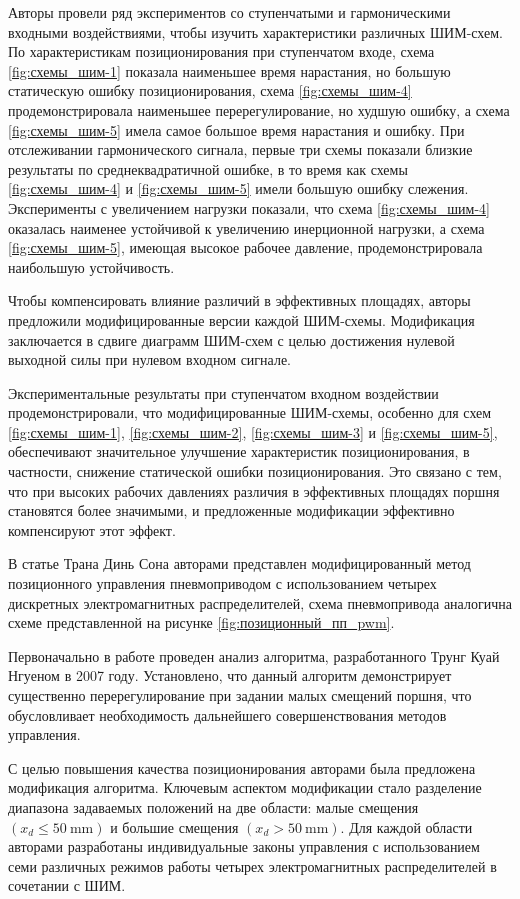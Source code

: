 Авторы провели ряд экспериментов со ступенчатыми и гармоническими входными воздействиями, чтобы изучить характеристики
различных ШИМ-схем. По характеристикам позиционирования при ступенчатом входе, схема \cref*{fig:схемы_шим-1} показала наименьшее время
нарастания, но большую статическую ошибку позиционирования, схема \cref*{fig:схемы_шим-4} продемонстрировала наименьшее перерегулирование,
но худшую ошибку, а схема \cref*{fig:схемы_шим-5} имела самое большое время нарастания и ошибку.
При отслеживании гармонического сигнала, первые три схемы показали близкие результаты по среднеквадратичной
ошибке, в то время как схемы \cref*{fig:схемы_шим-4} и \cref*{fig:схемы_шим-5} имели большую ошибку слежения. Эксперименты с увеличением нагрузки показали,
что схема \cref*{fig:схемы_шим-4}
оказалась наименее устойчивой к увеличению инерционной нагрузки, а схема \cref*{fig:схемы_шим-5}, имеющая высокое рабочее давление,
продемонстрировала наибольшую
устойчивость.

Чтобы компенсировать влияние различий в эффективных площадях, авторы предложили модифицированные версии каждой ШИМ-схемы.
Модификация заключается в сдвиге диаграмм ШИМ-схем с целью достижения нулевой выходной силы при нулевом входном сигнале.

Экспериментальные результаты при ступенчатом входном воздействии продемонстрировали, что модифицированные ШИМ-схемы, особенно для схем \cref*{fig:схемы_шим-1},
\cref*{fig:схемы_шим-2}, \cref*{fig:схемы_шим-3} и \cref*{fig:схемы_шим-5}, обеспечивают значительное улучшение характеристик позиционирования,
в частности, снижение статической ошибки позиционирования. Это связано с тем, что при высоких рабочих давлениях различия в эффективных площадях поршня
становятся более значимыми, и предложенные модификации эффективно компенсируют этот эффект.

В статье Трана Динь Сона \cite*{Tran:pwm} авторами представлен модифицированный метод позиционного управления
пневмоприводом с использованием четырех дискретных электромагнитных распределителей, схема пневмопривода аналогична схеме
представленной на рисунке \cref*{fig:позиционный_пп_pwm}.

Первоначально в работе проведен анализ алгоритма, разработанного Трунг Куай Нгуеном \cite*{Truong}
в 2007 году. Установлено, что данный алгоритм демонстрирует существенно
перерегулирование при задании малых смещений поршня, что обусловливает необходимость
дальнейшего совершенствования методов управления.

С целью повышения качества позиционирования авторами была предложена модификация
алгоритма. Ключевым аспектом модификации стало разделение диапазона задаваемых
положений на две области: малые смещения $(x_d \leqslant \text{50}~\si{\milli\metre})$
и большие смещения $(x_d > \text{50}~\si{\milli\metre})$.
Для каждой области авторами разработаны индивидуальные законы управления с использованием
семи различных режимов работы четырех электромагнитных распределителей в сочетании с ШИМ.

